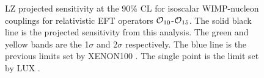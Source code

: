\begin{figure}[!htbp]
\caption{LZ projected sensitivity at the 90\% CL for isoscalar WIMP-nucleon couplings for relativistic EFT operators $\operatorname{\mathcal{O}}_{10}$-$\operatorname{\mathcal{O}}_{15}$.
         The solid black line is the projected sensitivity from this analysis. 
         The green and yellow bands are the 1$\sigma$ and 2$\sigma$ respectively.
         The blue line is the previous limits set by XENON100 \cite{xenon100_eft_ref}.
         The single point is the limit set by LUX \cite{LUX_RUN4_EFT_2021}.}
\label{fig:EFT_Result_Projected_Sensitivity_2}
\end{figure}